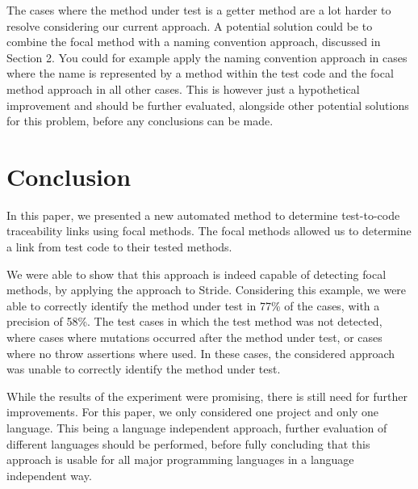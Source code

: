 \documentclass[11pt]{article}
\begin{document}
\begin{multicols}{2}
The cases where the method under test is a getter method are a lot harder to resolve considering our current approach. A potential solution could be to combine the focal method with a naming convention approach, discussed in Section 2. You could for example apply the naming convention approach in cases where the name is represented by a method within the test code and the focal method approach in all other cases. This is however just a hypothetical improvement and should be further evaluated, alongside other potential solutions for this problem, before any conclusions can be made.

\section{Conclusion}
In this paper, we presented a new automated method to determine test-to-code traceability links using focal methods. The focal methods allowed us to determine a link from test code to their tested methods.

We were able to show that this approach is indeed capable of detecting focal methods, by applying the approach to Stride. Considering this example, we were able to correctly identify the method under test in 77\% of the cases, with a precision of 58\%. The test cases in which the test method was not detected, where cases where mutations occurred after the method under test, or cases where no throw assertions where used. In these cases, the considered approach was unable to correctly identify the method under test.

While the results of the experiment were promising, there is still need for further improvements. For this paper, we only considered one project and only one language. This being a language independent approach, further evaluation of different languages should be performed, before fully concluding that this approach is usable for all major programming languages in a language independent way.

\printbibliography
\end{multicols}
\end{document}
